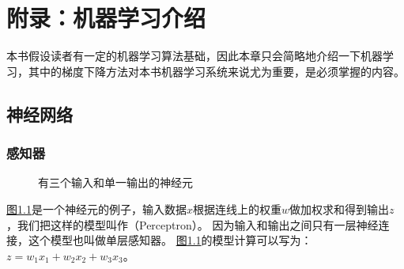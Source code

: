 \documentclass[letterpaper,10pt,english]{sphinxmanual}
\let\sphinxpxdimen\pdfpxdimen\else\newdimen\sphinxpxdimen
\begin{document}
\chapter{附录：机器学习介绍}
\label{\detokenize{appendix_machine_learning_introduction/index:id1}}\label{\detokenize{appendix_machine_learning_introduction/index::doc}}
\sphinxAtStartPar
本书假设读者有一定的机器学习算法基础，因此本章只会简略地介绍一下机器学习，其中的梯度下降方法对本书机器学习系统来说尤为重要，是必须掌握的内容。


\section{神经网络}
\label{\detokenize{appendix_machine_learning_introduction/neural_network:id1}}\label{\detokenize{appendix_machine_learning_introduction/neural_network::doc}}

\subsection{感知器}
\label{\detokenize{appendix_machine_learning_introduction/neural_network:id2}}
\begin{figure}[H]
\centering
\capstart

\noindent\sphinxincludegraphics[width=600\sphinxpxdimen]{{single_neuron2}.png}
\caption{有三个输入和单一输出的神经元}\label{\detokenize{appendix_machine_learning_introduction/neural_network:id15}}\label{\detokenize{appendix_machine_learning_introduction/neural_network:single-neuron}}\end{figure}

\sphinxAtStartPar
\hyperref[\detokenize{appendix_machine_learning_introduction/neural_network:single-neuron}]{图\ref{\detokenize{appendix_machine_learning_introduction/neural_network:single-neuron}}}是一个神经元的例子，输入数据\(x\)根据连线上的权重\(w\)做加权求和得到输出\(z\)，我们把这样的模型叫作（Perceptron）。
因为输入和输出之间只有一层神经连接，这个模型也叫做单层感知器。
\hyperref[\detokenize{appendix_machine_learning_introduction/neural_network:single-neuron}]{图\ref{\detokenize{appendix_machine_learning_introduction/neural_network:single-neuron}}}的模型计算可以写为：\(z = w_{1}x_{1}+ w_{2}x_{2} + w_{3}x_{3}\)。
\end{document}
